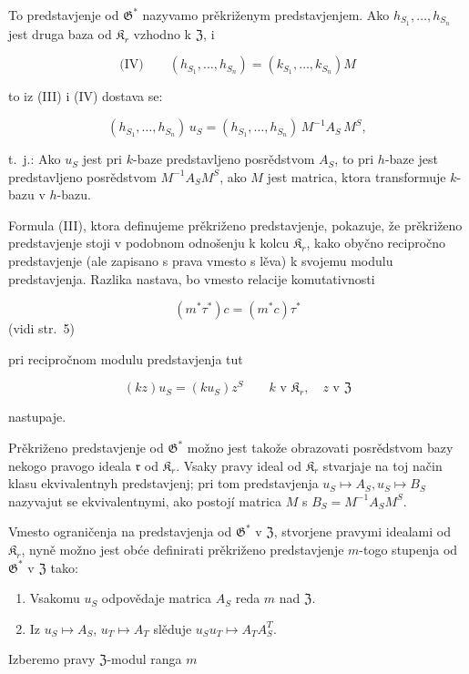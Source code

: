 \documentclass[11pt]{article}
\begin{document}
To predstavjenje od \(\mathfrak{G}^*\) nazyvamo prěkriženym predstavjenjem. Ako \(h_{S_1}, \ldots, h_{S_n}\) jest druga baza od \(\mathfrak{K}_r\) vzhodno k \(\mathfrak{Z}\), i

\[
\text{(IV)}\qquad (h_{S_1}, \ldots, h_{S_n}) = (k_{S_1}, \ldots, k_{S_n})M
\]

to iz (III) i (IV) dostava se:

\[(h_{S_1},\ldots,h_{S_n})\,u_S=(h_{S_1},\ldots,h_{S_n})\,M^{-1}A_S\,M^S,\]

t.~j.: Ako \(u_S\) jest pri \(k\)-baze predstavljeno posrědstvom \(A_S\), to pri \(h\)-baze jest predstavljeno posrědstvom \(M^{-1}A_SM^S\), ako \(M\) jest matrica, ktora transformuje \(k\)-bazu v \(h\)-bazu.

Formula (III), ktora definujeme prěkriženo predstavjenje, pokazuje, že prěkriženo predstavjenje stoji v podobnom odnošenju k kolcu \(\mathfrak K_r\), kako obyčno recipročno predstavjenje (ale zapisano s prava vmesto s lěva) k svojemu modulu predstavjenja. Razlika nastava, bo vmesto relacije komutativnosti

\[(m^*\tau^*)c = (m^*c)\tau^*\]
(vidi str.~5)

pri recipročnom modulu predstavjenja tut

\[
(kz)u_S=(ku_S)z^S\qquad k\text{ v }\mathfrak K_r,\quad z\text{ v }\mathfrak Z
\]

nastupaje.

Prěkriženo predstavjenje od \(\mathfrak{G}^*\) možno jest takože obrazovati posrědstvom bazy nekogo pravogo ideala \(\mathfrak r\) od \(\mathfrak{K}_r\). Vsaky pravy ideal od \(\mathfrak{K}_r\) stvarjaje na toj način klasu ekvivalentnyh predstavjenj; pri tom predstavjenja \(u_S \mapsto A_S, u_S \mapsto B_S\) nazyvajut se ekvivalentnymi, ako postojí matrica \(M\) s \(B_S = M^{-1}A_SM^S\).

Vmesto ograničenja na predstavjenja od \(\mathfrak G^*\) v \(\mathfrak Z\), stvorjene pravymi idealami od \(\mathfrak K_r\), nyně možno jest obće definirati prěkriženo predstavjenje \(m\)-togo stupenja od \(\mathfrak G^*\) v \(\mathfrak Z\) tako:

\begin{enumerate}
\item Vsakomu \(u_S\) odpovědaje matrica \(A_S\) reda \(m\) nad \(\mathfrak Z\).
\item Iz \(u_S \mapsto A_S\), \(u_T \mapsto A_T\) slěduje \(u_Su_T \mapsto A_TA_S^T\).
\end{enumerate}

Izberemo pravy \(\mathfrak Z\)-modul ranga \(m\)
\end{document}
